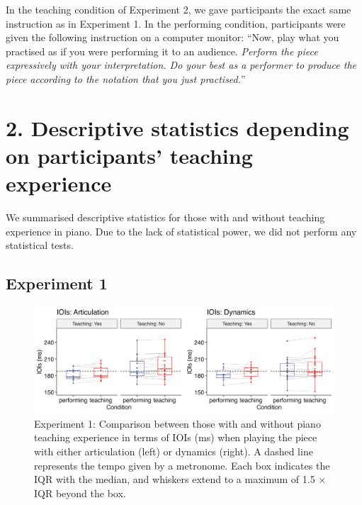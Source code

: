 \documentclass[
  man,floatsintext]{apa6}
\begin{document}
In the teaching condition of Experiment 2, we gave participants the exact same instruction as in Experiment 1. In the performing condition, participants were given the following instruction on a computer monitor: ``Now, play what you practised as if you were performing it to an audience. \emph{Perform the piece expressively with your interpretation. Do your best as a performer to produce the piece according to the notation that you just practised.}''

\clearpage

\hypertarget{descriptive-statistics-depending-on-participants-teaching-experience}{%
\section{2. Descriptive statistics depending on participants' teaching experience}\label{descriptive-statistics-depending-on-participants-teaching-experience}}

We summarised descriptive statistics for those with and without teaching experience in piano. Due to the lack of statistical power, we did not perform any statistical tests.

\hypertarget{experiment-1-2}{%
\subsection{Experiment 1}\label{experiment-1-2}}

\begin{figure}
\includegraphics[width=1\linewidth]{manuscript_files/figure-latex/plot-ioi-teaching-1-1} \caption{\label{fig:ioi-teaching-1}Experiment 1: Comparison between those with and without piano teaching experience in terms of IOIs (ms) when playing the piece with either articulation (left) or dynamics (right). A dashed line represents the tempo given by a metronome. Each box indicates the IQR with the median, and whiskers extend to a maximum of 1.5 × IQR beyond the box.}\label{fig:plot-ioi-teaching-1}
\end{figure}
\end{document}
